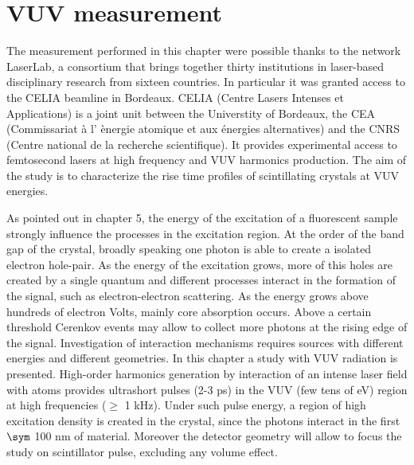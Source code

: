 
\chapter{VUV measurement}
The measurement performed in this chapter were possible thanks to the network LaserLab, a consortium that brings together thirty institutions in laser-based disciplinary research from sixteen countries. In particular it was granted access to the CELIA beamline in Bordeaux.
CELIA (Centre Lasers Intenses et Applications) is a joint unit between the Universtity of Bordeaux, the CEA (Commissariat à l' \`{e}nergie atomique et aux énergies alternatives) and the CNRS (Centre national de la recherche scientifique). It provides experimental access to femtosecond lasers at high frequency and VUV harmonics production.
The aim of the study is to characterize the rise time profiles of scintillating crystals at VUV energies.

As pointed out in chapter 5, the energy of the excitation of a fluorescent sample strongly influence the processes in the excitation region.
At the order of the band gap of the crystal, broadly speaking one photon is able to create a isolated electron hole-pair. As the energy of the excitation grows, more of this holes are created by a single quantum and different processes interact in the formation of the signal, such as electron-electron scattering.
As the energy grows above hundreds of electron Volts, mainly core absorption occurs. 
Above a certain threshold Cerenkov events may allow to collect more photons at the rising edge of the signal. 
Investigation of interaction mechanisms requires sources with different energies and different geometries.
In this chapter a study with VUV radiation is presented. High-order harmonics generation by interaction of an intense laser field with atoms provides ultrashort pulses (2-3 ps) in the VUV (few tens of eV) region at high frequencies ($\geq$ 1 kHz). 
Under such pulse energy, a region of high excitation density is created in the crystal, since the photons interact in the first $\sym$ 100 nm of material.
Moreover the detector geometry will allow to focus the study on scintillator pulse, excluding any volume effect.

